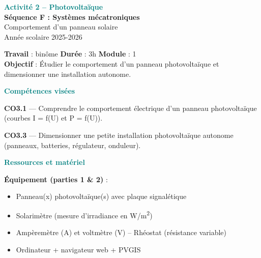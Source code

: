 \documentclass[a4paper, 11pt, oneside]{article}
\begin{document}
\begin{center}
{\huge \textcolor{teal}{\textbf{Activité 2 -- Photovoltaïque}}}\\[0.4cm]
{\large \textbf{Séquence F : Systèmes mécatroniques}}\\[0.2cm]
{\normalsize Comportement d'un panneau solaire}\\[0.2cm]
{\small Année scolaire 2025-2026}
\end{center}

\vspace{0.8cm}

\begin{tcolorbox}[colback=cyancol!10, colframe=cyancol]
\textbf{Travail} : binôme \quad \textbf{Durée} : 3h \quad \textbf{Module} : 1\\[4pt]
\textbf{Objectif} : Étudier le comportement d'un panneau photovoltaïque et dimensionner une installation autonome.
\end{tcolorbox}

\vspace{0.6cm}

\textcolor{teal}{\textbf{\large Compétences visées}}

\vspace{0.3cm}
\begin{minipage}{0.48\textwidth}
\textbf{CO3.1} --- Comprendre le comportement électrique d'un panneau photovoltaïque (courbes I = f(U) et P = f(U)).
\end{minipage}
\hfill
\begin{minipage}{0.48\textwidth}
\textbf{CO3.3} --- Dimensionner une petite installation photovoltaïque autonome (panneaux, batteries, régulateur, onduleur).
\end{minipage}

\vspace{0.8cm}

\textcolor{teal}{\textbf{\large Ressources et matériel}}

\vspace{0.2cm}
\textbf{Équipement (parties 1 \& 2)} :
\begin{itemize}
  \item Panneau(x) photovoltaïque(s) avec plaque signalétique
  \item Solarimètre (mesure d'irradiance en W/m\textsuperscript{2})
  \item Ampèremètre (A) et voltmètre (V) -- Rhéostat (résistance variable)
  \item Ordinateur + navigateur web + PVGIS
\end{itemize}
\end{document}
